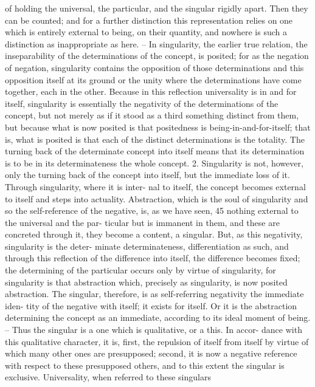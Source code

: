 of holding the universal, the particular, and the singular rigidly apart. Then
they can be counted; and for a further distinction this representation relies
on one which is entirely external to being, on their quantity, and nowhere
is such a distinction as inappropriate as here. – In singularity, the earlier
true relation, the inseparability of the determinations of the concept, is
posited; for as the negation of negation, singularity contains the opposition
of those determinations and this opposition itself at its ground or the unity
where the determinations have come together, each in the other. Because
in this reflection universality is in and for itself, singularity is essentially
the negativity of the determinations of the concept, but not merely as if it
stood as a third something distinct from them, but because what is now
posited is that positedness is being-in-and-for-itself; that is, what is posited is
that each of the distinct determinations is the totality. The turning back of
the determinate concept into itself means that its determination is to be in
its determinateness the whole concept.
2. Singularity is not, however, only the turning back of the concept into
itself, but the immediate loss of it. Through singularity, where it is inter-
nal to itself, the concept becomes external to itself and steps into actuality.
Abstraction, which is the soul of singularity and so the self-reference of the
negative, is, as we have seen, 45 nothing external to the universal and the par-
ticular but is immanent in them, and these are concreted through it, they
become a content, a singular. But, as this negativity, singularity is the deter-
minate determinateness, differentiation as such, and through this reflection
of the difference into itself, the difference becomes fixed; the determining
of the particular occurs only by virtue of singularity, for singularity is that
abstraction which, precisely as singularity, is now posited abstraction.
The singular, therefore, is as self-referring negativity the immediate iden-
tity of the negative with itself; it exists for itself. Or it is the abstraction
determining the concept as an immediate, according to its ideal moment of
being. – Thus the singular is a one which is qualitative, or a this. In accor-
dance with this qualitative character, it is, first, the repulsion of itself from
itself by virtue of which many other ones are presupposed; second, it is now
a negative reference with respect to these presupposed others, and to this
extent the singular is exclusive. Universality, when referred to these singulars

